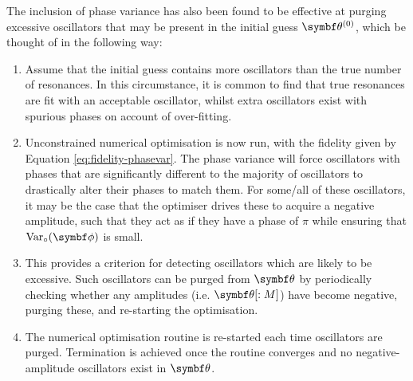 The inclusion of phase variance has also been found to be effective at purging
excessive oscillators that may be present in the initial guess $\bthzero$,
which be thought of in the following way:
\begin{enumerate}
    \item Assume that the initial guess contains more oscillators than the
        true number of resonances. In this circumstance, it is common to find
        that true resonances are fit with an acceptable oscillator, whilst
        extra oscillators exist with spurious phases on account of
        over-fitting.
    \item Unconstrained numerical optimisation is now run, with the fidelity
        given by Equation \ref{eq:fidelity-phasevar}. The phase variance will
        force oscillators with phases that are significantly different to the
        majority of oscillators to drastically alter their phases to match
        them. For some/all of these oscillators, it may be the case that the
        optimiser drives these to acquire a negative amplitude, such that they
        act as if they have a phase of $\pi$ while ensuring that $\circvar$ is
        small.
    \item This provides a criterion for detecting oscillators which are likely
        to be excessive. Such oscillators can be purged from $\bth$ by
        periodically checking whether any amplitudes (i.e. $\bth[:M]$) have
        become negative, purging these, and re-starting the optimisation.
    \item The numerical optimisation routine is re-started each time
        oscillators are purged. Termination is achieved once the routine
        converges and no negative-amplitude oscillators exist in $\bth$.
\end{enumerate}


